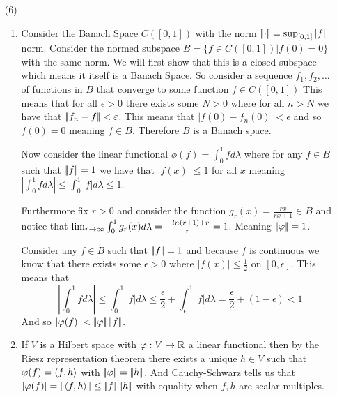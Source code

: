 \documentclass[12pt]{amsart}
\begin{document}
\begin{itemize}
   \item[(6)] 
   \begin{enumerate}[label=(\alph*)]
      \item Consider the Banach Space $C([0,1])$ with the norm $\norm{\cdot}=\sup_{[0,1]}|f|$ norm. 
      Consider the normed subspace $B=\{f\in C([0,1])|f(0)=0\}$ with the same norm. 
      We will first show that this is a closed subspace which means it itself is a Banach Space.
      So consider a sequence $f_1,f_2,\dots$ of functions in $B$ that converge to some function $f\in C([0,1])$
      This means that for all $\epsilon>0$ there exists some $N>0$ where for all $n>N$ we have that 
      $\norm{f_n-f}<\epsilon$. This means that $|f(0)-f_n(0)|<\epsilon$ and so $f(0)=0$ meaning $f\in B$. 
      Therefore $B$ is a Banach space.
   
      Now consider the linear functional $\phi(f)=\int_0^1f d\lambda$ where 
      for any $f\in B$ such that $\norm{f}=1$ we have that $|f(x)|\leq 1$ for 
      all $x$ meaning $\left|\int_0^1fd\lambda\right|\leq \int_0^1|f|d\lambda\leq 1$. 
      
      Furthermore fix $r>0$ and consider the function $g_r(x)=\frac{rx}{rx+1}\in B$ 
      and notice that $\lim_{r\rightarrow\infty}\int_0^1g_r(x)d\lambda=\frac{-ln(r+1)+r}{r}=1$.
      Meaning $\norm{\phi}=1$.
   
      Consider any $f\in B$ such that $\norm{f}=1$ and because $f$ is continuous 
      we know that there exists some $\epsilon>0$ where
      $|f(x)|\leq\frac{1}{2}$ on $[0,\epsilon]$. This means 
      that 
      \[\left|\int_0^1fd\lambda\right|\leq \int_0^1|f|d\lambda\leq \frac{\epsilon}{2}+\int_\epsilon^1|f|d\lambda=\frac{\epsilon}{2}+(1-\epsilon)< 1\]
      And so $|\phi(f)|<\norm{\phi}\norm{f}$.
      \item If $V$ is a Hilbert space with $\varphi:V\rightarrow\mathbb{R}$ a linear functional 
      then by the Riesz representation theorem 
      there exists a unique $h\in V$ such that $\varphi(f)=\left\langle f,h \right\rangle$ with $\norm{\phi}=\norm{h}$.
      And Cauchy-Schwarz tells us that $|\phi(f)|=|\ip{f,h}|\leq\norm{f}\norm{h}$ 
      with equality when $f,h$ are scalar multiples.

   \end{enumerate}

\end{itemize}
\end{document}
